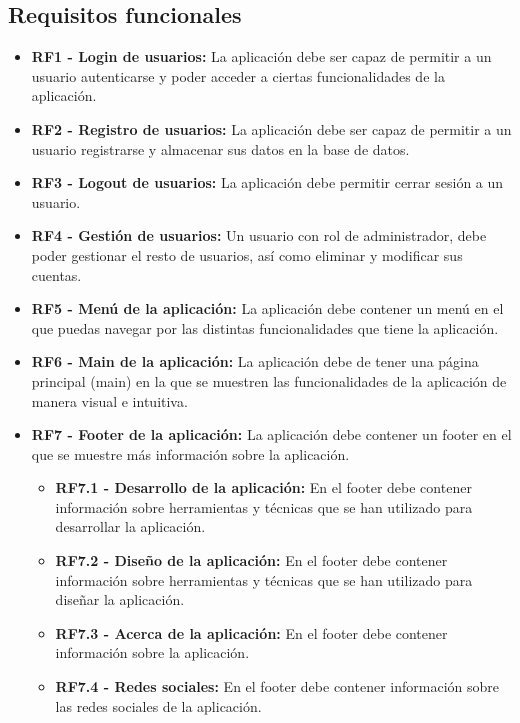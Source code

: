 \subsection{Requisitos funcionales}
\begin{itemize}
\tightlist
    \item \textbf{RF1 - Login de usuarios:} La aplicación debe ser capaz de permitir a un usuario autenticarse y poder acceder a ciertas funcionalidades de la aplicación.
    \item \textbf{RF2 - Registro de usuarios:} La aplicación debe ser capaz de permitir a un usuario registrarse y almacenar sus datos en la base de datos.
    \item \textbf{RF3 - Logout de usuarios:} La aplicación debe permitir cerrar sesión a un usuario.
    \item \textbf{RF4 - Gestión de usuarios:} Un usuario con rol de administrador, debe poder gestionar el resto de usuarios, así como eliminar y modificar sus cuentas.
    \item \textbf{RF5 - Menú de la aplicación:} La aplicación debe contener un menú en el que puedas navegar por las distintas funcionalidades que tiene la aplicación.
    \item \textbf{RF6 - Main de la aplicación:} La aplicación debe de tener una página principal (main) en la que se muestren las funcionalidades de la aplicación de manera visual e intuitiva.
    \item \textbf{RF7 - Footer de la aplicación:} La aplicación debe contener un footer en el que se muestre más información sobre la aplicación.
        \begin{itemize}
        \tightlist
            \item \textbf{RF7.1 - Desarrollo de la aplicación:} En el footer debe contener información sobre herramientas y técnicas que se han utilizado para desarrollar la aplicación.
            \item \textbf{RF7.2 - Diseño de la aplicación:} En el footer debe contener información sobre herramientas y técnicas que se han utilizado para diseñar la aplicación.
            \item \textbf{RF7.3 - Acerca de la aplicación:} En el footer debe contener información sobre la aplicación.
            \item \textbf{RF7.4 - Redes sociales:} En el footer debe contener información sobre las redes sociales de la aplicación.
        \end{itemize}
    

\end{itemize}
